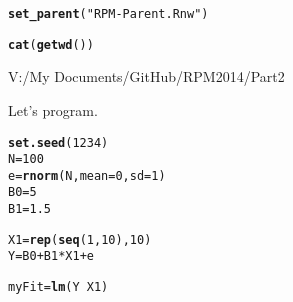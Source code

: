 \documentclass[xcolor=dvipsnames]{beamer}
\makeatletter
\newcommand{\hlnum}[1]{\textcolor[rgb]{0.686,0.059,0.569}{#1}}%
\newcommand{\hlstr}[1]{\textcolor[rgb]{0.192,0.494,0.8}{#1}}%
\newcommand{\hlopt}[1]{\textcolor[rgb]{0,0,0}{#1}}%
\newcommand{\hlstd}[1]{\textcolor[rgb]{0.345,0.345,0.345}{#1}}%
\newcommand{\hlkwb}[1]{\textcolor[rgb]{0.69,0.353,0.396}{#1}}%
\newcommand{\hlkwc}[1]{\textcolor[rgb]{0.333,0.667,0.333}{#1}}%
\newcommand{\hlkwd}[1]{\textcolor[rgb]{0.737,0.353,0.396}{\textbf{#1}}}%
\newenvironment{kframe}{%
 \def\at@end@of@kframe{}%
 \ifinner\ifhmode%
  \def\at@end@of@kframe{\end{minipage}}%
  \begin{minipage}{\columnwidth}%
 \fi\fi%
 \def\FrameCommand##1{\hskip\@totalleftmargin \hskip-\fboxsep
 \colorbox{shadecolor}{##1}\hskip-\fboxsep
     \hskip-\linewidth \hskip-\@totalleftmargin \hskip\columnwidth}%
 \MakeFramed {\advance\hsize-\width
   \@totalleftmargin\z@ \linewidth\hsize
   \@setminipage}}%
 {\par\unskip\endMakeFramed%
 \at@end@of@kframe}
\newenvironment{knitrout}{}{} %
\makeatother
\begin{document}
\begin{knitrout}
\color{fgcolor}\begin{kframe}
\begin{alltt}
\hlkwd{set_parent}\hlstd{(}\hlstr{"RPM-Parent.Rnw"}\hlstd{)}
\end{alltt}


{\ttfamily\noindent\color{warningcolor}{\#\# Warning: cannot open file 'RPM-Parent.Rnw': No such file or directory}}

{\ttfamily\noindent\bfseries\color{errorcolor}{\#\# Error: cannot open the connection}}\end{kframe}
\end{knitrout}


\begin{frame}[fragile]
\begin{kframe}
\begin{alltt}
\hlkwd{cat}\hlstd{(}\hlkwd{getwd}\hlstd{())}
\end{alltt}
\end{kframe}V:/My Documents/GitHub/RPM2014/Part2

\end{frame}

\begin{frame}[fragile]
Let's program.
\begin{knitrout}
\color{fgcolor}\begin{kframe}
\begin{alltt}
\hlkwd{set.seed}\hlstd{(}\hlnum{1234}\hlstd{)}
\hlstd{N} \hlkwb{=} \hlnum{100}
\hlstd{e} \hlkwb{=} \hlkwd{rnorm}\hlstd{(N,} \hlkwc{mean} \hlstd{=} \hlnum{0}\hlstd{,} \hlkwc{sd} \hlstd{=} \hlnum{1}\hlstd{)}
\hlstd{B0} \hlkwb{=} \hlnum{5}
\hlstd{B1} \hlkwb{=} \hlnum{1.5}

\hlstd{X1} \hlkwb{=} \hlkwd{rep}\hlstd{(}\hlkwd{seq}\hlstd{(}\hlnum{1}\hlstd{,} \hlnum{10}\hlstd{),} \hlnum{10}\hlstd{)}
\hlstd{Y} \hlkwb{=} \hlstd{B0} \hlopt{+} \hlstd{B1} \hlopt{*} \hlstd{X1} \hlopt{+} \hlstd{e}

\hlstd{myFit} \hlkwb{=} \hlkwd{lm}\hlstd{(Y} \hlopt{~} \hlstd{X1)}
\end{alltt}
\end{kframe}
\end{knitrout}

\end{frame}
\end{document}
